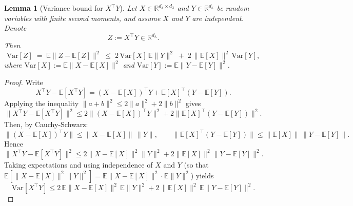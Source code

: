 \documentclass[11pt, twoside]{report}
\newtheorem{lemma}[theorem]{Lemma}
\begin{document}
\begin{lemma}[Variance bound for $X^\top Y$] \label{var_lemma_appendix}
\label{lem:var_XtY}
Let \(X\in\mathbb{R}^{d_x\times d_\lambda}\) and \(Y\in\mathbb{R}^{d_x}\) be random variables with finite second moments, and assume \(X\) and \(Y\) are independent. Denote
\[
Z := X^\top Y \in \mathbb{R}^{d_\lambda}.
\]
Then
\[
\mathrm{Var}[Z] \;=\; \mathbb{E}\big\|Z - \mathbb{E}[Z]\big\|^2
\;\le\; 2\,\mathrm{Var}[X] \,\mathbb{E}\|Y\|^2
\;+\; 2\,\big\|\mathbb{E}[X]\big\|^2 \,\mathrm{Var}[Y],
\]
where \(\mathrm{Var}[X]:=\mathbb{E}\|X-\mathbb{E}[X]\|^2\) and \(\mathrm{Var}[Y]:=\mathbb{E}\|Y-\mathbb{E}[Y]\|^2\).
\end{lemma}

\begin{proof}
Write
\[
X^\top Y - \mathbb{E}[X^\top Y] = (X - \mathbb{E}[X])^\top Y + \mathbb{E}[X]^\top (Y - \mathbb{E}[Y]).
\]
Applying the inequality \(\|a+b\|^2 \le 2\|a\|^2 + 2\|b\|^2\) gives
\[
\|X^\top Y - \mathbb{E}[X^\top Y]\|^2
\le 2\|(X-\mathbb{E}[X])^\top Y\|^2 + 2\|\mathbb{E}[X]^\top (Y-\mathbb{E}[Y])\|^2.
\]
Then, by Cauchy-Schwarz:
\[
\|(X-\mathbb{E}[X])^\top Y\| \le \|X-\mathbb{E}[X]\|\,\|Y\|, \qquad
\|\mathbb{E}[X]^\top (Y-\mathbb{E}[Y])\| \le \|\mathbb{E}[X]\|\,\|Y-\mathbb{E}[Y]\|.
\]
Hence
\[
\|X^\top Y - \mathbb{E}[X^\top Y]\|^2
\le 2 \|X-\mathbb{E}[X]\|^2 \|Y\|^2 + 2 \|\mathbb{E}[X]\|^2 \|Y-\mathbb{E}[Y]\|^2.
\]
Taking expectations and using independence of \(X\) and \(Y\) (so that \(\mathbb{E}[\|X-\mathbb{E}[X]\|^2\|Y\|^2] = \mathbb{E}\|X-\mathbb{E}[X]\|^2 \cdot \mathbb{E}\|Y\|^2\)) yields
\[
\mathrm{Var}[X^\top Y]
\le 2\,\mathbb{E}\|X-\mathbb{E}[X]\|^2 \,\mathbb{E}\|Y\|^2
+ 2\,\|\mathbb{E}[X]\|^2 \,\mathbb{E}\|Y-\mathbb{E}[Y]\|^2.
\]
\end{proof}
\end{document}
